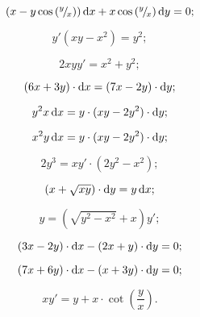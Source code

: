 \begin{multicols}{2}
\begin{problem}
	\[ \left( x - y \cos \left({}^{y}\!/_{\!x}\right)\right) \mathop{}\!\mathrm{d} x + x \cos \left({}^{y}\!/_{\!x}\right) \mathop{}\!\mathrm{d} y = 0; \]
\end{problem}
\begin{problem}
	\[ y' (xy - x^2) = y^2; \]
\end{problem}
\begin{problem}
	\[ 2xyy' = x^2 + y^2; \]
\end{problem}
\begin{problem}
	\[ (6x + 3y) \cdot \mathop{}\!\mathrm{d} x = (7x - 2y) \cdot \mathop{}\!\mathrm{d} y; \]
\end{problem}
\begin{problem}
	\[ y^2 x \mathop{}\!\mathrm{d} x = y \cdot (xy - 2y^2) \cdot \mathop{}\!\mathrm{d} y; \]
\end{problem}
\begin{problem}
	\[ x^2 y \mathop{}\!\mathrm{d} x = y \cdot (xy - 2y^2) \cdot \mathop{}\!\mathrm{d} y; \]
\end{problem}
\begin{problem}
	\[ 2y^3 = xy' \cdot (2y^2 - x^2); \]
\end{problem}
\begin{problem}
	\[ \left( x + \sqrt{xy}\right) \cdot \mathop{}\!\mathrm{d} y = y \mathop{}\!\mathrm{d} x; \]
\end{problem}
\begin{problem}
	\[ y = \left( \sqrt{y^2 - x^2} + x\right) y'; \]
\end{problem}
\begin{problem}
	\[ (3x - 2y) \cdot \mathop{}\!\mathrm{d} x - (2x + y) \cdot \mathop{}\!\mathrm{d} y = 0; \]
\end{problem}
\begin{problem}
	\[ (7x + 6y) \cdot \mathop{}\!\mathrm{d} x - (x + 3y) \cdot \mathop{}\!\mathrm{d} y = 0; \]
\end{problem}
\begin{problem}
	\[ xy' = y + x \cdot \cot \left(\frac{y}{x}\right). \]
\end{problem}
\end{multicols}

